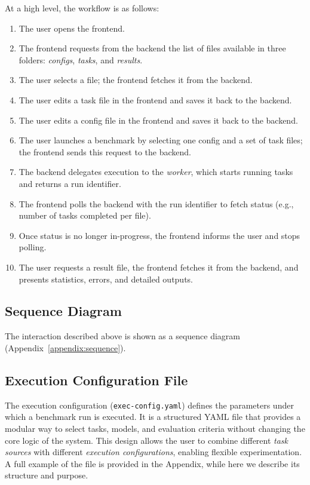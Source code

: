 At a high level, the workflow is as follows:
\begin{enumerate}
    \item The user opens the frontend.
    \item The frontend requests from the backend the list of files available in three folders: \textit{configs}, \textit{tasks}, and \textit{results}.
    \item The user selects a file; the frontend fetches it from the backend.
    \item The user edits a task file in the frontend and saves it back to the backend.
    \item The user edits a config file in the frontend and saves it back to the backend.
    \item The user launches a benchmark by selecting one config and a set of task files; the frontend sends this request to the backend.
    \item The backend delegates execution to the \textit{worker}, which starts running tasks and returns a run identifier.
    \item The frontend polls the backend with the run identifier to fetch status (e.g., number of tasks completed per file).
    \item Once status is no longer in-progress, the frontend informs the user and stops polling.
    \item The user requests a result file, the frontend fetches it from the backend, and presents statistics, errors, and detailed outputs.
\end{enumerate}

\subsection{Sequence Diagram}

The interaction described above is shown as a sequence diagram (Appendix~\ref{appendix:sequence}).

\subsection{Execution Configuration File}

The execution configuration (\texttt{exec-config.yaml}) defines the parameters under which a benchmark run is executed.
It is a structured YAML file that provides a modular way to select tasks, models, and evaluation criteria without changing the core logic of the system.
This design allows the user to combine different \emph{task sources} with different \emph{execution configurations}, enabling flexible experimentation.
A full example of the file is provided in the Appendix, while here we describe its structure and purpose.

